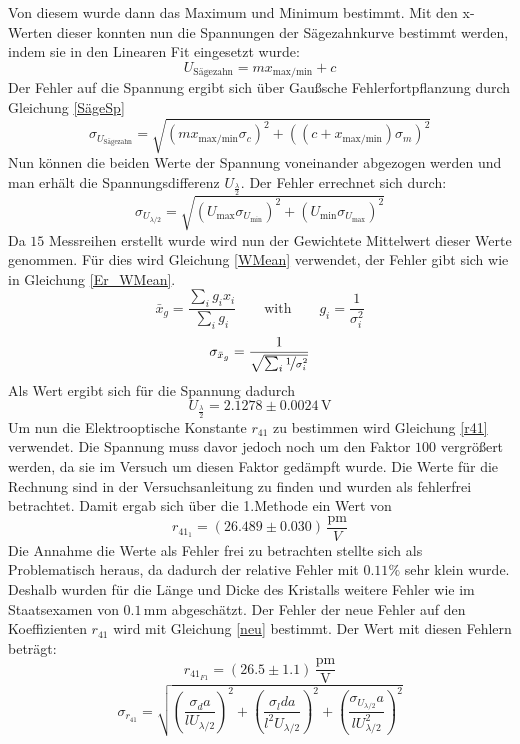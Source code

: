 Von diesem wurde dann das Maximum und Minimum bestimmt. Mit den x-Werten dieser konnten nun die Spannungen der Sägezahnkurve bestimmt werden, indem sie in den Linearen Fit eingesetzt wurde:
\begin{equation}
	U_\text{Sägezahn}= mx_{\text{max/min}} + c
\end{equation}
Der Fehler auf die Spannung ergibt sich über Gaußsche Fehlerfortpflanzung durch Gleichung \ref{SägeSp}
\begin{equation}
	\sigma_{U_\text{Sägezahn}}=\sqrt{\left(mx_{\text{max/min}}\sigma_c\right)^2+\left((c + x_{\text{max/min}})\sigma_m\right)^2}
	\label{SägeSp}
\end{equation}
Nun können die beiden Werte der Spannung voneinander abgezogen werden und man erhält die Spannungsdifferenz $U_{\frac{\lambda}{2}}$. Der Fehler errechnet sich durch:
\begin{equation}
	\sigma_{U_{\lambda/2}}=\sqrt{\left(U_\text{max}\sigma_{U_{\text{min}}}\right)^2+\left(U_{\text{min}}\sigma_{U_{\text{max}}}\right)^2}
	\label{Errdif}
\end{equation}
Da $15$ Messreihen erstellt wurde wird nun der Gewichtete Mittelwert dieser Werte genommen. Für dies wird Gleichung \ref{WMean} verwendet, der Fehler gibt sich wie in Gleichung \ref{Er_WMean}.
\begin{equation}
\bar{x}_g=\frac{\sum_ig_ix_i}{\sum_ig_i} \qquad \text{with} \qquad g_i=\frac{1}{\sigma_i^2}
\label{WMean}
\end{equation}
\begin{equation}
\sigma_{\bar{x}_g}=\frac{1}{\sqrt{\sum_i\nicefrac{1}{\sigma_i^2}}}
\label{Er_WMean}
\end{equation}
Als Wert ergibt sich für die Spannung dadurch $$U_{\frac{\lambda}{2}}=2.1278\pm0.0024\,\text{V}$$
Um nun die Elektrooptische Konstante $r_{41}$ zu bestimmen wird Gleichung \ref{r41} verwendet. Die Spannung muss davor jedoch noch um den Faktor $100$ vergrößert werden, da sie im Versuch um diesen Faktor gedämpft wurde. Die Werte für die Rechnung sind in der Versuchsanleitung \cite{anleitung} zu finden und wurden als fehlerfrei betrachtet. Damit ergab sich über die 1.Methode ein Wert von $$r_{41_1}=(26.489\pm0.030)\,\frac{\text{pm}}{V}$$
Die Annahme die Werte als Fehler frei zu betrachten stellte sich als Problematisch heraus, da dadurch der relative Fehler mit $0.11\%$ sehr klein wurde. Deshalb wurden für die Länge und Dicke des Kristalls weitere Fehler wie im Staatsexamen\cite{staatsex_farpock} von $0.1\,$mm abgeschätzt. Der Fehler der neue Fehler auf den Koeffizienten $r_{41}$ wird mit Gleichung \ref{neu} bestimmt. Der Wert mit diesen Fehlern beträgt:
$$r_{41_{F1}}=(26.5\pm1.1)\,\frac{\text{pm}}{\text{V}}$$
\begin{equation}
	\sigma_{r_{41}}=\sqrt{\left(\frac{\sigma_da}{lU_{\lambda/2}}\right)^2+\left(\frac{\sigma_lda}{l^2U_{\lambda/2}}\right)^2+\left(\frac{\sigma_{U_{\lambda/2}}a}{lU_{\lambda/2}^2}\right)^2}
	\label{neu}
\end{equation}
